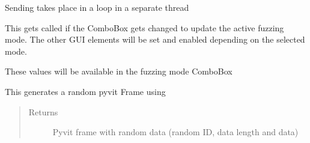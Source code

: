 \documentclass[letterpaper,10pt,english]{sphinxmanual}
\begin{document}
\begin{fulllineitems}
\begin{fulllineitems}
\end{fulllineitems}


\begin{fulllineitems}
\label{\detokenize{src:src.FuzzerTab.FuzzerTab.fuzzSenderThread}}
Sending takes place in a loop in a separate thread

\end{fulllineitems}


\begin{fulllineitems}
\label{\detokenize{src:src.FuzzerTab.FuzzerTab.fuzzingModeChanged}}
This gets called if the ComboBox gets changed to update the active fuzzing mode.
The other GUI elements will be set and enabled depending on the selected mode.

\end{fulllineitems}


\begin{fulllineitems}
\label{\detokenize{src:src.FuzzerTab.FuzzerTab.fuzzingModeComboBoxValuePairs}}
These values will be available in the fuzzing mode ComboBox

\end{fulllineitems}


\begin{fulllineitems}
\label{\detokenize{src:src.FuzzerTab.FuzzerTab.generateRandomPacket}}
This generates a random pyvit Frame using 
\begin{quote}\begin{description}
\item[{Returns}] \leavevmode
Pyvit frame with random data (random ID, data length and data)

\end{description}\end{quote}

\end{fulllineitems}


\end{fulllineitems}
\end{document}
